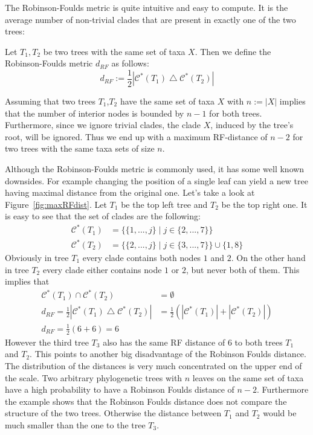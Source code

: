 The Robinson-Foulds metric is quite intuitive and easy to compute. It is the average number of non-trivial clades that are present in exactly one of the two trees:
\begin{defin}
Let $T_1,T_2$ be two trees with the same set of taxa $X$. Then we define the Robinson-Foulds metric $d_{RF}$ as follows:
\[ d_{RF} := \frac{1}{2}|\mathcal{C}^*(T_1) \bigtriangleup \mathcal{C}^*(T_2)| \]
\end{defin}
\begin{rem}
Assuming that two trees $T_1$,$T_2$ have the same set of taxa $X$ with $n:= |X|$ implies that the number of interior nodes is bounded by $n-1$ for both trees. Furthermore, since we ignore trivial clades, the clade $X$, induced by the tree's root, will be ignored. Thus we end up with a maximum RF-distance of $n-2$ for two trees with the same taxa sets of size $n$.
\end{rem}
Although the Robinson-Foulds metric is commonly used, it has some well known downsides. For example changing the position of a single leaf can yield a new tree having maximal distance from the original one. Let's take a look at Figure~\ref{fig:maxRFdist}. Let $T_1$ be the top left tree and $T_2$ be the top right one. It is easy to see that the set of clades are the following:
\begin{align*}
\mathcal{C}^*(T_1) &=\{ \{1,...,j\}\;|\;j\in \{2,...,7\}\} \\
\mathcal{C}^*(T_2) &=\{ \{2,...,j\}\;|\;j\in \{3,...,7\}\} \cup \{1,8\}
\end{align*}
Obviously in tree $T_1$ every clade contains both nodes $1$ and $2$. On the other hand in tree $T_2$ every clade either contains node $1$ or $2$, but never both of them. This implies that 
\begin{align*}
\mathcal{C}^*(T_1) \cap \mathcal{C}^*(T_2) &= \emptyset \\
d_{RF} = \frac{1}{2}|\mathcal{C}^*(T_1) \bigtriangleup \mathcal{C}^*(T_2)| &= \frac{1}{2}(|\mathcal{C}^*(T_1)| + |\mathcal{C}^*(T_2)|) \\
d_{RF} = \frac{1}{2}(6 + 6) = 6
\end{align*}
However the third tree $T_3$ also has the same RF distance of $6$ to both trees $T_1$ and $T_2$. This points to another big disadvantage of the Robinson Foulds distance. The distribution of the distances is very much concentrated on the upper end of the scale. Two arbitrary phylogenetic trees with $n$ leaves on the same set of taxa have a high probability to have a Robinson Foulds distance of $n-2$. Furthermore the example shows that the Robinson Foulds distance does not compare the structure of the two trees. Otherwise the distance between $T_1$ and $T_2$ would be much smaller than the one to the tree $T_3$. 
